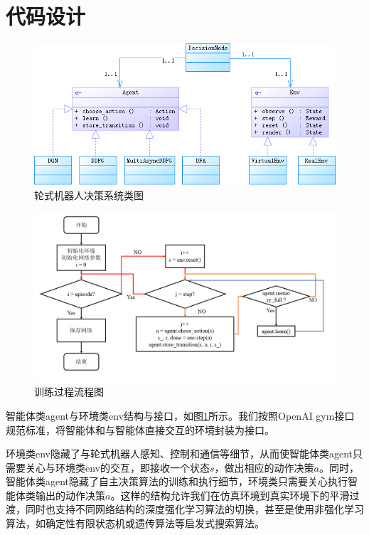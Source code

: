 \section{代码设计}
\begin{figure}[ht]
  \centering
  \includegraphics[width=\textwidth]{figures/classchart.png}
  \caption{轮式机器人决策系统类图}\label{classchart}
\end{figure}

\begin{figure}[ht]
  \centering
  \includegraphics[width=\textwidth]{figures/flowchart.png}
  \caption{训练过程流程图}\label{flowchart}
\end{figure}

智能体类agent与环境类env结构与接口，如图\ref{classchart}所示。我们按照OpenAI gym接口规范标准，将智能体和与智能体直接交互的环境封装为接口。

环境类env隐藏了与轮式机器人感知、控制和通信等细节，从而使智能体类agent只需要关心与环境类env的交互，即接收一个状态$s$，做出相应的动作决策$a$。同时，智能体类agent隐藏了自主决策算法的训练和执行细节，环境类只需要关心执行智能体类输出的动作决策$a$。这样的结构允许我们在仿真环境到真实环境下的平滑过渡，同时也支持不同网络结构的深度强化学习算法的切换，甚至是使用非强化学习算法，如确定性有限状态机或遗传算法等启发式搜索算法。

